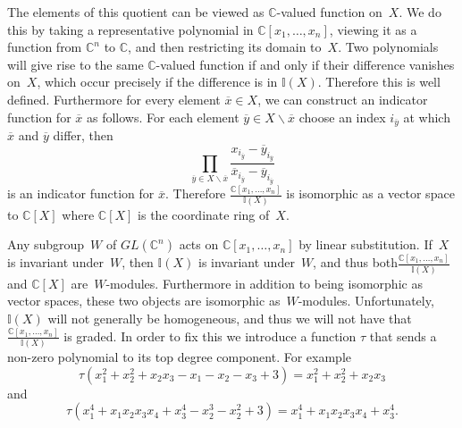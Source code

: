 \documentclass[10pt]{article}
\begin{document}
The elements of this quotient can be viewed as $\mathbb{C}$-valued function on~$X$. We do this by taking a representative 
polynomial in $\mathbb{C}[x_1,\ldots, x_n]$, viewing it as a function from $\mathbb{C}^n$ to $\mathbb{C}$, and then restricting 
its domain to~$X$. Two polynomials will give rise to the same $\mathbb{C}$-valued function if and only if their difference 
vanishes on~$X$, which occur precisely if the difference is in $\mathbb{I}(X)$. Therefore this is well defined. Furthermore 
for every element $\overline{x}\in X$, we can construct an indicator function for $\overline{x}$ as follows. For each element 
$\overline{y}\in X\backslash \overline{x}$ choose an index $i_{\overline{y}}$ at which $\overline{x}$ and $\overline{y}$ 
differ, then
\begin{equation}
\prod_{\overline{y}\in X\backslash \overline{x}} 
\frac{x_{i_{\overline{y}}}-\overline{y}_{i_{\overline{y}}}}{\overline{x}_{i_{\overline{y}}}-\overline{y}_{i_{\overline{y}}}}
\end{equation}
is an indicator function for $\overline{x}$. Therefore $\frac{\mathbb{C}[x_1,\ldots, x_n]}{\mathbb{I}(X)}$ is 
isomorphic as a vector space to $\mathbb{C}[X]$ where $\mathbb{C}[X]$ is the coordinate ring of~$X$.

Any subgroup~$W$ of $GL(\mathbb{C}^n)$ acts on $\mathbb{C}[x_1,\ldots, x_n]$ by linear substitution. If~$X$ is invariant 
under~$W$, then $\mathbb{I}(X)$ is invariant under~$W$, and thus both$\frac{\mathbb{C}[x_1,\ldots, x_n]}{\mathbb{I}(X)}$ and 
$\mathbb{C}[X]$ are~$W$-modules. Furthermore in addition to being isomorphic as vector spaces, these two objects are 
isomorphic as~$W$-modules. Unfortunately, $\mathbb{I}(X)$ will not generally be homogeneous, and thus we will not have that 
$\frac{\mathbb{C}[x_1,\ldots, x_n]}{\mathbb{I}(X)}$ is graded. In order to fix this we introduce a function $\tau$ that sends 
a non-zero polynomial to its top degree component. For 
example
\begin{equation}
\tau(x_1^2+x_2^2+x_2x_3-x_1-x_2-x_3+3)=x_1^2+x_2^2+x_2x_3
\end{equation}
and
\begin{equation}
\tau(x_1^4+x_1x_2x_3x_4+x_3^4-x_2^3-x_2^2+3)=x_1^4+x_1x_2x_3x_4+x_3^4.
\end{equation}
\end{document}
